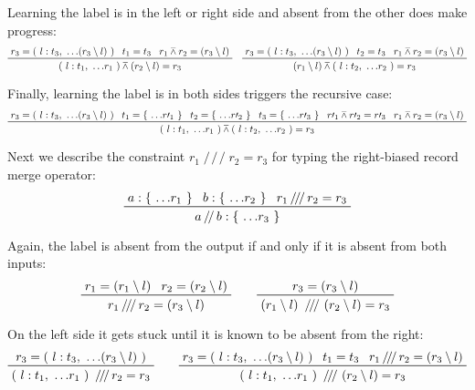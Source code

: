 \documentclass[11pt, twoside, reqno]{book}
\providecommand{\wedgeonwedge}{\barwedge}
\begin{document}
Learning the label is in the left or right side and absent from the other does make progress:
\begin{displaymath}
\prftree
  {r_3 = (\ l : t_3,\ \dots\!(r_3 \setminus l)\ )}
  {t_1 = t_3}
  {r_1 \wedgeonwedge r_2 = (r_3 \setminus l)}
  {(\ l : t_1,\ \dots\!r_1\ ) \wedgeonwedge (r_2 \setminus l) = r_3}
\quad
\prftree
  {r_3 = (\ l : t_3,\ \dots\!(r_3 \setminus l)\ )}
  {t_2 = t_3}
  {r_1 \wedgeonwedge r_2 = (r_3 \setminus l)}
  {(r_1 \setminus l) \wedgeonwedge (\ l : t_2,\ \dots\!r_2\ ) = r_3}
\end{displaymath}

Finally, learning the label is in both sides triggers the recursive case:
\begin{displaymath}
\prftree
  {r_3 = (\ l : t_3,\ \dots\!(r_3 \setminus l)\ )}
  {t_1 = \{\ \dots\!r\prime_1\ \}}
  {t_2 = \{\ \dots\!r\prime_2\ \}}  
  {t_3 = \{\ \dots\!r\prime_3\ \}}
  {r\prime_1 \wedgeonwedge r\prime_2 = r\prime_3}
  {r_1 \wedgeonwedge r_2 = (r_3 \setminus l)}
  {(\ l : t_1,\ \dots\!r_1\ ) \wedgeonwedge (\ l : t_2,\ \dots\!r_2\ ) = r_3}
\end{displaymath}



Next we describe the constraint \(r_1 \mathop{/\!/\!/} r_2 = r_3\) for typing the right-biased record merge operator:
\begin{displaymath}
\prftree{a : \{\ \dots\!r_1\ \}}{b : \{\ \dots\!r_2\ \}}{r_1 \mathop{/\!/\!/} r_2 = r_3}{a \mathop{/\!/} b : \{\ \dots\!r_3\ \}}
\end{displaymath}

Again, the label is absent from the output if and only if it is absent from both inputs:
\begin{displaymath}
\prftree{r_1 = (r_1 \setminus l)}{r_2 = (r_2 \setminus l)}{r_1 \mathop{/\!/\!/} r_2 = (r_3 \setminus l)}
\qquad
\prftree{r_3 = (r_3 \setminus l)}{(r_1 \setminus l)\ \mathop{/\!/\!/}\ (r_2 \setminus l) = r_3}
\end{displaymath}

On the left side it gets stuck until it is known to be absent from the right:
\begin{displaymath}
\prftree
  {r_3 = (\ l : t_3,\ \dots\!(r_3 \setminus l)\ )}
  {(\ l : t_1,\ \dots\!r_1\ )\ \mathop{/\!/\!/} r_2 = r_3}
\qquad
\prftree
  {r_3 = (\ l : t_3,\ \dots\!(r_3 \setminus l)\ )}
  {t_1 = t_3}
  {r_1 \mathop{/\!/\!/} r_2 = (r_3 \setminus l)}
  {(\ l : t_1,\ \dots\!r_1\ )\ \mathop{/\!/\!/}\ (r_2 \setminus l) = r_3}
\end{displaymath}
\end{document}
